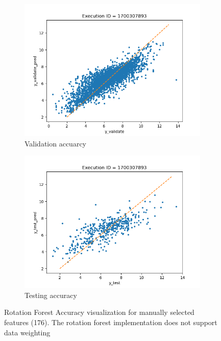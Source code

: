 \documentclass[11pt]{article}
\begin{document}
\begin{figure}
     \centering
     \begin{subfigure}[b]{0.45\textwidth}
         \centering
         \includegraphics[scale=0.45]{images/accuracyRotationFRvalidate}
         \caption{Validation accuarcy}
        \label{fig:accuracyRotationFRvalidate}
     \end{subfigure}
     \hfill
     \begin{subfigure}[b]{0.45\textwidth}
         \centering
         \includegraphics[scale=0.45]{images/accuracyRotationFRtest}
        \caption{Testing accuracy}
        \label{fig:accuracyRotationFRtest}
     \end{subfigure}
     \caption{Rotation Forest Accuracy visualization for manually selected features (176).  The rotation forest implementation does not support data weighting}
     \label{fig:RotationForestAccuracy}
\end{figure}
\end{document}
